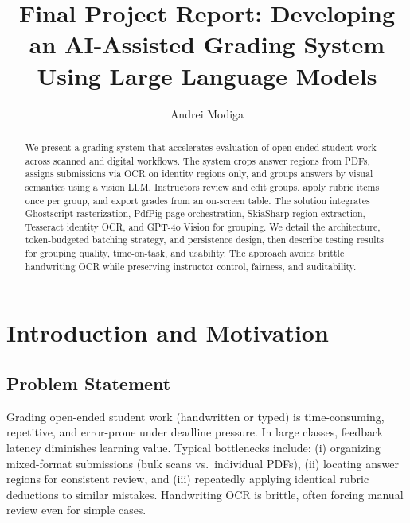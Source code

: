 \documentclass[ms,twoside,print]{nuthesis}
\begin{document}
\frontmatter

\title{Final Project Report: Developing an AI-Assisted Grading System Using Large Language Models}
\author{Andrei Modiga}

\maketitle

\begin{abstract}
We present a grading system that accelerates evaluation of open-ended student work across scanned and digital workflows. The system crops answer regions from PDFs, assigns submissions via OCR on identity regions only, and groups answers by visual semantics using a vision LLM. Instructors review and edit groups, apply rubric items once per group, and export grades from an on-screen table. The solution integrates Ghostscript rasterization, PdfPig page orchestration, SkiaSharp region extraction, Tesseract identity OCR, and GPT-4o Vision for grouping\cite{ghostscript,pdfpig,skiasharp,tesseract,openai-gpt4o}. We detail the architecture, token-budgeted batching strategy, and persistence design, then describe testing results for grouping quality, time-on-task, and usability. The approach avoids brittle handwriting OCR while preserving instructor control, fairness, and auditability.
\end{abstract}

\setcounter{tocdepth}{2}
\tableofcontents
\listoffigures
\listoftables

\mainmatter

\chapter{Introduction and Motivation}
\section{Problem Statement}
Grading open-ended student work (handwritten or typed) is time-consuming, repetitive, and error-prone under deadline pressure. In large classes, feedback latency diminishes learning value. Typical bottlenecks include: (i) organizing mixed-format submissions (bulk scans vs.\ individual PDFs), (ii) locating answer regions for consistent review, and (iii) repeatedly applying identical rubric deductions to similar mistakes. Handwriting OCR is brittle, often forcing manual review even for simple cases.
\end{document}
